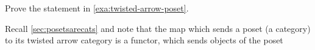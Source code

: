 \begin{exercise}
    Prove the statement in \cref{exa:twisted-arrow-poset}.
\end{exercise}
\begin{solution}
\end{solution}
\begin{remark}
    Recall \cref{sec:posetsarecats} and note that the map which sends a poset (a category) to its twisted arrow category is a functor, which sends objects of the poset
\end{remark}
